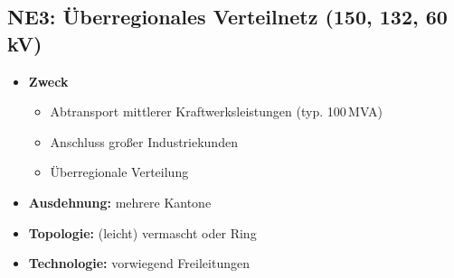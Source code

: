 

\subsection{NE3: Überregionales Verteilnetz (150, 132, 60\,kV)}
    \begin{minipage}[t]{0.5\columnwidth}
        \begin{itemize}
            \item \textbf{Zweck}
            \begin{itemize}
                \item Abtransport mittlerer Kraftwerksleistungen (typ. 100\,MVA)
                \item Anschluss großer Industriekunden
                \item Überregionale Verteilung
            \end{itemize}
        \end{itemize}
    \end{minipage}%
    \hfill
    \begin{minipage}[t]{0.49\columnwidth}
        \begin{itemize}
            \item \textbf{Ausdehnung:} mehrere Kantone
            \item \textbf{Topologie:} (leicht) vermascht oder Ring
            \item \textbf{Technologie:} vorwiegend Freileitungen
        \end{itemize}
    \end{minipage}

